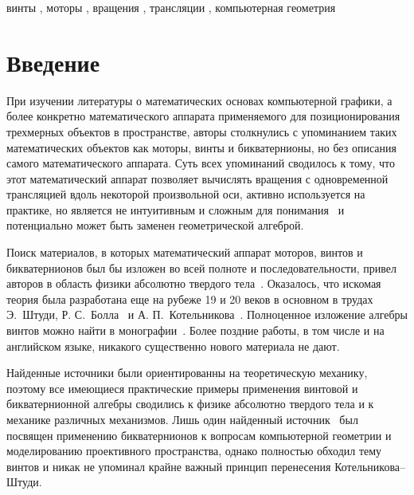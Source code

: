\documentclass[%
]{ittmm}
\begin{document}
\begin{keywords}
  винты \sep
  моторы \sep
  вращения \sep
  трансляции \sep
  компьютерная геометрия
\end{keywords}

\maketitle

\section{Введение}
\label{sec:intro}

При изучении литературы о математических основах компьютерной графики, а более конкретно математического аппарата применяемого для позиционирования трехмерных объектов в пространстве, авторы столкнулись с упоминанием таких математических объектов как моторы, винты и бикватернионы, но без описания самого математического аппарата. Суть всех упоминаний сводилось к тому, что этот математический аппарат позволяет вычислять вращения с одновременной трансляцией вдоль некоторой произвольной оси, активно используется на практике, но является не интуитивным и сложным для понимания~\cite{Lengyel:GameEngine:v1:2016} и потенциально может быть заменен геометрической алгеброй.

Поиск материалов, в которых математический аппарат моторов, винтов и бикватернионов был бы изложен во всей полноте и последовательности, привел авторов в область физики абсолютно твердого тела~\cite{Chelnokov:2006}. Оказалось, что искомая теория была разработана еще на рубеже 19 и 20 веков в основном в трудах Э.~Штуди, Р. С.~Болла~\cite[73]{KleinHoherGeometrie} и А. П.~Котельникова~\cite{Kotelnikov:2019}. Полноценное изложение алгебры винтов можно найти в монографии~\cite{Dimentberg:1965}. Более поздние работы, в том числе и на английском языке, никакого существенно нового материала не дают.

Найденные источники были ориентированны на теоретическую механику, поэтому все имеющиеся практические примеры применения винтовой и бикватернионной алгебры сводились к физике абсолютно твердого тела и к механике различных механизмов. Лишь один найденный источник~\cite{Goldman2024} был посвящен применению бикватернионов к вопросам компьютерной геометрии и моделированию проективного пространства, однако полностью обходил тему винтов и никак не упоминал крайне важный принцип перенесения Котельникова--Штуди.
\end{document}
